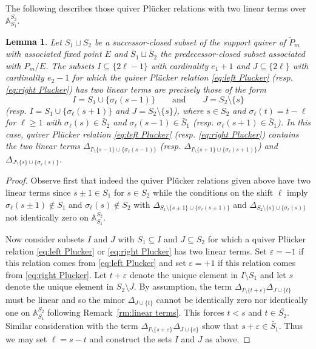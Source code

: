 \documentclass{amsart}
\newtheorem{lemma}[theorem]{Lemma}
\numberwithin{equation}{section}
\renewcommand{\AA}{\mathbb{A}}
\begin{document}
  The following describes those quiver Pl\"ucker relations with two linear terms over $\AA_{S_1}^{S_2}$.
  \begin{lemma}
    Let $S_1\sqcup S_2$ be a successor-closed subset of the support quiver of $\tilde P_m$ with associated fixed point $E$ and $\bar{S}_1\sqcup\bar{S}_2$ the predecessor-closed subset associated with $P_m/E$.
    The subsets $I\subseteq\{2\ell-1\}$ with cardinality $e_1+1$ and $J\subseteq\{2\ell\}$ with cardinality $e_2-1$ for which the quiver Pl\"ucker relation \eqref{eq:left Plucker} (resp. \eqref{eq:right Plucker}) has two linear terms are precisely those of the form
    \[I=S_1\cup\{\sigma_\ell(s-1)\} \qquad \text{and} \qquad J=S_2\setminus\{s\}\]
    (resp. $I=S_1\cup\{\sigma_\ell(s+1)\}$ and $J=S_2\setminus\{s\}$), where $s\in S_2$ and $\sigma_\ell(t)=t-\ell$ for $\ell\ge1$ with $\sigma_\ell(s)\in\bar{S}_2$ and $\sigma_\ell(s-1)\in\bar{S}_1$ (resp. $\sigma_\ell(s+1)\in\bar{S}_1$).
    In this case, quiver Pl\"ucker relation \eqref{eq:left Plucker} (resp. \eqref{eq:right Plucker}) contains the two linear terms $\Delta_{I\setminus\{s-1\}\cup\{\sigma_\ell(s-1)\}}$ (resp. $\Delta_{I\setminus\{s+1\}\cup\{\sigma_\ell(s+1)\}}$) and $\Delta_{J\setminus\{s\}\cup\{\sigma_\ell(s)\}}$.
  \end{lemma}
  \begin{proof}
    Observe first that indeed the quiver Pl\"ucker relations given above have two linear terms since $s\pm1\in S_1$ for $s\in S_2$ while the conditions on the shift $\ell$ imply $\sigma_\ell(s\pm1)\notin S_1$ and $\sigma_\ell(s)\notin S_2$ with $\Delta_{S_1\setminus\{s\pm1\}\cup\{\sigma_\ell(s\pm1)\}}$ and $\Delta_{S_2\setminus\{s\}\cup\{\sigma_\ell(s)\}}$ not identically zero on $\AA_{S_1}^{S_2}$.

    Now consider subsets $I$ and $J$ with $S_1\subseteq I$ and $J\subseteq S_2$ for which a quiver Pl\"ucker relation \eqref{eq:left Plucker} or \eqref{eq:right Plucker} has two linear terms.
    Set $\varepsilon=-1$ if this relation comes from \eqref{eq:left Plucker} and set $\varepsilon=+1$ if this relation comes from \eqref{eq:right Plucker}.
    Let $t+\varepsilon$ denote the unique element in $I\setminus S_1$ and let $s$ denote the unique element in $S_2\setminus J$.
    By assumption, the term $\Delta_{I\setminus\{t+\varepsilon\}} \Delta_{J\cup\{t\}}$ must be linear and so the minor $\Delta_{J\cup\{t\}}$ cannot be identically zero nor identically one on $\AA_{S_1}^{S_2}$ following Remark~\ref{rm:linear terms}.
    This forces $t<s$ and $t\in\bar{S_2}$.
    Similar consideration with the term $\Delta_{I\setminus\{s+\varepsilon\}} \Delta_{J\cup\{s\}}$ show that $s+\varepsilon\in\bar{S}_1$.
    Thus we may set $\ell=s-t$ and construct the sets $I$ and $J$ as above.
  \end{proof}
\end{document}
